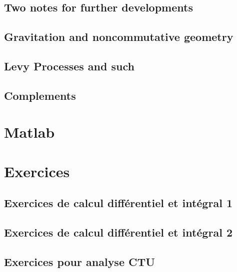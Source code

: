 \documentclass[a4paper,twoside,11pt]{book}
\begin{document}
\chapter{Two notes for further developments}        \label{ChapNoteDev}



\chapter{Gravitation and noncommutative geometry}


\chapter{Levy Processes and such}


\chapter{Complements}









\emptyInputPath
{}

\part{Matlab}




\emptyInputPath
{}
\part{Exercices}







\chapter{Exercices de calcul différentiel et intégral 1}



\chapter{Exercices de calcul différentiel et intégral 2}




\chapter{Exercices pour analyse CTU}


{
}



\emptyInputPath
{}

\end{document}
